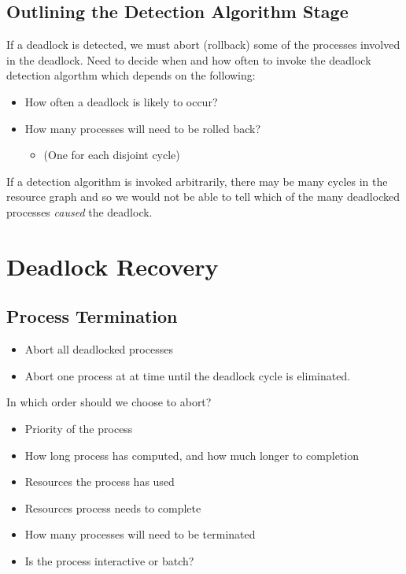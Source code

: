 \documentclass[11pt]{article}
\begin{document}
\subsection{Outlining the Detection Algorithm Stage}
\label{sec:org2b2a75d}
If a deadlock is  detected, we must abort (rollback) some of the processes involved in the deadlock.
Need to decide when and how often to invoke the deadlock detection algorthm which depends on the following:
\begin{itemize}
\item How often a deadlock is likely to occur?
\item How many processes will need to be rolled back?
\begin{itemize}
\item (One for each disjoint cycle)
\end{itemize}
\end{itemize}

If a detection algorithm is invoked arbitrarily, there may be many cycles in the resource graph and so we would not be able to tell which of the many deadlocked processes \emph{caused} the deadlock.

\section{Deadlock Recovery}
\label{sec:org39ec003}
\subsection{Process Termination}
\label{sec:orge38a333}
\begin{itemize}
\item Abort all deadlocked processes
\item Abort one process at at time until the deadlock cycle is eliminated.
\end{itemize}

In which order should we choose to abort?
\begin{itemize}
\item Priority of the process
\item How long process has computed, and how much longer to completion
\item Resources the process has used
\item Resources process needs to complete
\item How many processes will need to be terminated
\item Is the process interactive or batch?
\end{itemize}
\end{document}

